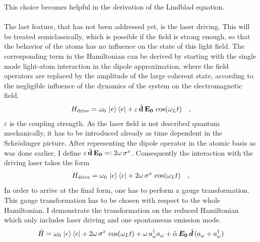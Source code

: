 This choice becomes helpful in the derivation of the Lindblad equation.\\\\
The last feature, that has not been addressed yet, is the laser driving. This will be treated semiclassically, which is possible if the field is strong enough, so that the behavior of the atoms has no influence on the state of this light field. The corresponding term in the Hamiltonian can be derived by starting with the single mode light-atom interaction in the dipole approximation, where the field operators are replaced by the amplitude of the large coherent state, according to the negligible influence of the dynamics of the system on the electromagnetic field. 
\begin{align*}
    H_\text{drive} = \omega_0\,\ket{e}\bra{e}+ \varepsilon\,\hat{\mathbf{d}}\,\mathbf{E_0}\,\cos(\omega_Lt)\quad,
\end{align*} 
$\varepsilon$ is the coupling strength. As the laser field is not described quantum mechanically, it has to be introduced already as time dependent in the Schrödinger picture. After representing the dipole operator in the atomic basis as was done earlier, I define $\varepsilon\,\hat{\mathbf{d}}\,\mathbf{E_0}=\vcentcolon2\omega\,\sigma^x$. Consequently the interaction with the driving laser takes the form
\begin{align*}
    H_\text{drive} = \omega_0\,\ket{e}\bra{e}+ 2\omega\,\sigma^x\,\cos(\omega_Lt)\quad,
\end{align*}
In order to arrive at the final form, one has to perform a gauge transformation. This gauge transformation has to be chosen with respect to the whole Hamiltonian. I demonstrate the transformation on the reduced Hamiltonian which only includes laser driving and one spontaneous emission mode.
\begin{align*}
    \tilde{H} = \omega_0\,\ket{e}\bra{e}+ 2\omega\,\sigma^x\,\cos(\omega_Lt)+\omega\,a^\dagger_\omega a_\omega+ \tilde{\alpha}\,\boldsymbol{E_0}\,\hat{\boldsymbol{d}}\,(a_\omega+a^\dagger_\omega)
\end{align*}

